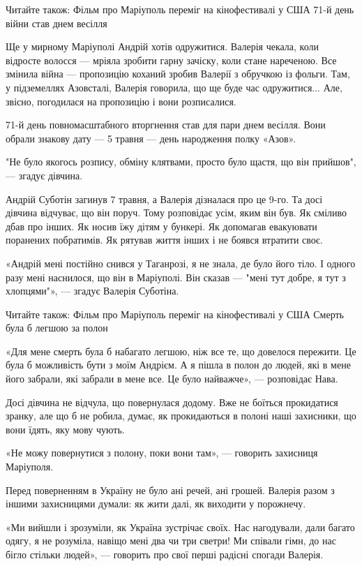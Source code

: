 Читайте також: Фільм про Маріуполь переміг на кінофестивалі у США 71-й день
війни став днем весілля

Ще у мирному Маріуполі Андрій хотів одружитися. Валерія чекала, коли відросте
волосся — мріяла зробити гарну зачіску, коли стане нареченою. Все змінила війна
— пропозицію коханий зробив Валерії з обручкою із фольги. Там, у підземеллях
Азовсталі, Валерія говорила, що ще буде час одружитися... Але, звісно, погодилася
на пропозицію і вони розписалися.

71-й день повномасштабного вторгнення став для пари днем весілля. Вони обрали
знакову дату — 5 травня — день народження полку «Азов».

"Не було якогось розпису, обміну клятвами, просто було щастя, що він прийшов",
— згадує дівчина.

Андрій Суботін загинув 7 травня, а Валерія дізналася про це 9-го. Та досі
дівчина відчуває, що він поруч. Тому розповідає усім, яким він був. Як сміливо
дбав про інших. Як носив їжу дітям у бункері. Як допомагав евакуювати поранених
побратимів. Як рятував життя інших і не боявся втратити своє.

«Андрій мені постійно снився у Таганрозі, я не знала, де було його тіло. І
одного разу мені наснилося, що він в Маріуполі. Він сказав — "мені тут добре, я
тут з хлопцями"», — згадує Валерія Суботіна.

Читайте також: Фільм про Маріуполь переміг на кінофестивалі у США Смерть була б
легшою за полон

«Для мене смерть була б набагато легшою, ніж все те, що довелося пережити. Це
була б можливість бути з моїм Андрієм. А я пішла в полон до людей, які в мене
його забрали, які забрали в мене все. Це було найважче», — розповідає Нава.

Досі дівчина не відчула, що повернулася додому. Вже не боїться прокидатися
зранку, але що б не робила, думає, як прокидаються в полоні наші захисники, що
вони їдять, яку мову чують.

«Не можу повернутися з полону, поки вони там», — говорить захисниця Маріуполя.

Перед поверненням в Україну не було ані речей, ані грошей. Валерія разом з
іншими захисницями думали: як жити далі, як виходити у порожнечу.

«Ми вийшли і зрозуміли, як Україна зустрічає своїх. Нас нагодували, дали багато
одягу, я не розуміла, навіщо мені два чи три светри! Ми співали гімн, до нас
бігло стільки людей», — говорить про свої перші радісні спогади Валерія.

